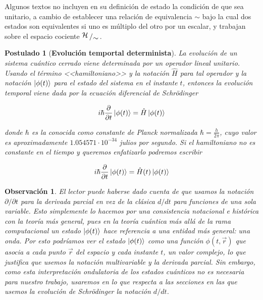 \documentclass[11pt, spanish]{report}
\newcommand{\bigslant}[2]{{\raisebox{.2em}{$#1$}\left/\raisebox{-.2em}{$#2$}\right.}}
\numberwithin{equation}{section}
\newtheorem{postu}{Postulado}
\newtheorem{obs}[defin]{Observación}
\numberwithin{defin}{section}
\begin{document}
\begin{appendices}
Algunos textos no incluyen en su definición de estado la condición de que sea unitario, a cambio de establecer una relación de equivalencia $\sim$ bajo la cual dos estados son equivalentes si uno es múltiplo del otro por un escalar, y trabajan sobre el espacio cociente $\bigslant{\mathcal{H}}{\sim}$.

\begin{postu}[\textbf{Evolución temportal determinista}]\label{post:evol}La evolución de un sistema cuántico cerrado viene determinada por un operador lineal unitario. Usando el término <<hamiltoniano>> y la notación $\hat{H}$ para tal operador y la notación $\ket{\phi(t)}$ para el estado del sistema en el instante $t$, entonces la evolución temporal viene dada por la ecuación diferencial de Schrödinger

\begin{equation}
i\hbar\frac{\partial}{\partial t}\ket{\phi(t)}=\hat{H}\ket{\phi(t)}
\end{equation}

donde $\hbar$ es la conocida como constante de Planck normalizada $\hbar=\frac{h}{2\pi}$, cuyo valor es aproximadamente $1.054571\cdot 10^{-34}$ julios por segundo. Si el hamiltoniano no es constante en el tiempo y queremos enfatizarlo podremos escribir

\begin{equation}
i\hbar\frac{\partial}{\partial t}\ket{\phi(t)}=\hat{H}(t)\ket{\phi(t)}
\end{equation}

\end{postu}

\begin{obs}
El lector puede haberse dado cuenta de que usamos la notación $\partial/\partial t$ para la derivada parcial en vez de la clásica  $d/dt$ para funciones de una sola variable. Esto simplemente lo hacemos por una consistencia notacional e histórica con la teoría más general, pues en la teoría cuántica más allá de la rama computacional un estado $\ket{\phi(t)}$ hace referencia a una entidad más general: una onda. Por esto podríamos ver el estado $\ket{\phi(t)}$ como una función $\phi(t,\vec{r})$ que asocia a cada punto $\vec{r}$ del espacio y cada instante $t$, un valor complejo, lo que justifica que usemos la notación multivariable y la derivada parcial. Sin embargo, como esta interpretación ondulatoria de los estados cuánticos no es necesaria para nuestro trabajo, usaremos en lo que respecta a las secciones en las que usemos la evolución de Schrödinger la notación $d/dt$.
\end{obs}


\end{appendices}
\end{document}
